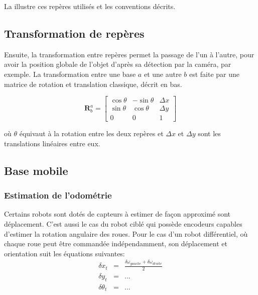 La  illustre ces repères utilisés et les conventions décrits.

\subsection{Transformation de repères}

Ensuite, la transformation entre repères permet la passage de l'un à l'autre, pour avoir la position globale de l'objet d'après sa détection par la caméra, par exemple. La transformation entre une base $a$ et une autre $b$ est faite par une matrice de rotation et translation classique, décrit en bas. 

\begin{equation*}
	\mathbf{R}^{a}_{b} = 
	\begin{bmatrix} 
	 	\cos \theta &  -\sin \theta & \Delta x \\ \sin \theta & \cos \theta & \Delta y \\ 0 & 0 & 1
	 \end{bmatrix}
\end{equation*}

où $\theta$ équivaut à la rotation entre les deux repères et $\Delta x$ et $\Delta y$ sont les translations linéaires entre eux.

\subsection{Base mobile}

\subsubsection{Estimation de l'odométrie}

Certains robots sont dotés de capteurs à estimer de façon
approximé sont déplacement. C'est aussi le cas du robot ciblé qui
possède encodeurs capables d'estimer la rotation angulaire des
roues. Pour le cas d'un robot différentiel, où chaque roue peut être
commandée indépendamment, son déplacement et orientation suit les équations suivantes:
\begin{equation*}
	\begin{array}{rcl}
		\delta x_t &=& \frac{\delta \omega_{gauche} + \delta \omega_{droite}}{2} \\
		\delta y_t &=& ...\\
		\delta \theta_t &=& ...								
	\end{array}
\end{equation*}

